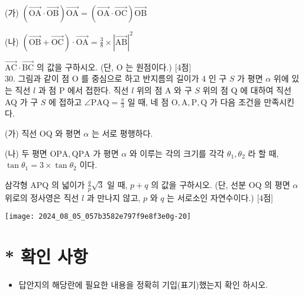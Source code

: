\documentclass[10pt]{article}
\begin{document}
(가) \((\overrightarrow{\mathrm{OA}} \cdot \overrightarrow{\mathrm{OB}}) \overrightarrow{\mathrm{OA}}=(\overrightarrow{\mathrm{OA}} \cdot \overrightarrow{\mathrm{OC}}) \overrightarrow{\mathrm{OB}}\)

(나) \((\overrightarrow{\mathrm{OB}}+\overrightarrow{\mathrm{OC}}) \cdot \overrightarrow{\mathrm{OA}}=\frac{3}{8} \times|\overrightarrow{\mathrm{AB}}|^{2}\)

\(\overrightarrow{\mathrm{AC}} \cdot \overrightarrow{\mathrm{BC}}\) 의 값을 구하시오. (단, O 는 원점이다.) [4점]\\
30. 그림과 같이 점 O 를 중심으로 하고 반지름의 길이가 4 인 구 \(S\) 가 평면 \(\alpha\) 위에 있는 직선 \(l\) 과 점 P 에서 접한다. 직선 \(l\) 위의 점 A 와 구 \(S\) 위의 점 Q 에 대하여 직선 AQ 가 구 \(S\) 에 접하고 \(\angle \mathrm{PAQ}=\frac{\pi}{3}\) 일 때, 네 점 \(\mathrm{O}, \mathrm{A}, \mathrm{P}, \mathrm{Q}\) 가 다음 조건을 만족시킨다.

(가) 직선 OQ 와 평면 \(\alpha\) 는 서로 평행하다.

(나) 두 평면 \(\mathrm{OPA}, \mathrm{QPA}\) 가 평면 \(\alpha\) 와 이루는 각의 크기를 각각 \(\theta_{1}, \theta_{2}\) 라 할 때, \(\tan \theta_{1}=3 \times \tan \theta_{2}\) 이다.

삼각형 APQ 의 넓이가 \(\frac{q}{p} \sqrt{3}\) 일 때, \(p+q\) 의 값을 구하시오. (단, 선분 OQ 의 평면 \(\alpha\) 위로의 정사영은 직선 \(l\) 과 만나지 않고, \(p\) 와 \(q\) 는 서로소인 자연수이다.) [4점]

\begin{center}
\texttt{[image: 2024\_08\_05\_057b3582e797f9e8f3e0g-20]}
\end{center}

\section*{* 확인 사항}
\begin{itemize}
  \item 답안지의 해당란에 필요한 내용을 정확히 기입(표기)했는지 확인 하시오.
\end{itemize}
\end{document}
